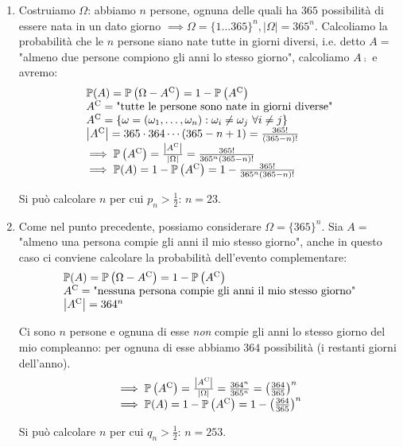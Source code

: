 \begin{enumerate}
\item Costruiamo $\Omega $: abbiamo $n$ persone, ognuna delle quali ha $365$ possibilità di essere nata in un dato giorno $\implies \Omega =\{1\dots 365\}^{n} ,| \Omega | =365^{n}$. Calcoliamo la probabilità che le $n$ persone siano nate tutte in giorni diversi, i.e. detto $A=$ "almeno due persone compiono gli anni lo stesso giorno", calcoliamo $A\comp$ e avremo:\begin{equation*}
\begin{array}{ l }
\mathbb{P}( A) =\mathbb{P}\left( \Omega -A^{\mathrm{C}}\right) =1-\mathbb{P}\left( A^{\mathrm{C}}\right)\\
A^{\mathrm{C}} =\text{"tutte le persone sono nate in giorni diverse"}\\
A^{\mathrm{C}} =\{\omega =( \omega _{1} ,\dots ,\omega _{n}) :\omega _{i} \neq \omega _{j} \ \forall i\neq j\}\\
\left| A^{\mathrm{C}}\right| =365\cdot 364\cdots ( 365-n+1) =\frac{365!}{( 365-n) !}\\
\implies \mathbb{P}\left( A^{\mathrm{C}}\right) =\frac{\left| A^{\mathrm{C}}\right| }{| \Omega | } =\frac{365!}{365^{n}( 365-n) !}\\
\implies \mathbb{P}( A) =1-\mathbb{P}\left( A^{\mathrm{C}}\right) =1-\frac{365!}{365^{n}( 365-n) !}
\end{array}
\end{equation*}

Si può calcolare $n$ per cui $p_{n}  >\frac{1}{2}$: $n=23$.
\item Come nel punto precedente, possiamo considerare $\Omega =\{365\}^{n}$. Sia $A=$ "almeno una persona compie gli anni il mio stesso giorno", anche in questo caso ci conviene calcolare la probabilità dell'evento complementare:\begin{equation*}
\begin{array}{ l }
\mathbb{P}( A) =\mathbb{P}\left( \Omega -A^{\mathrm{C}}\right) =1-\mathbb{P}\left( A^{\mathrm{C}}\right)\\
A^{\mathrm{C}} =\text{"nessuna persona compie gli anni il mio stesso giorno"}\\
\left| A^{\mathrm{C}}\right| =364^{n}
\end{array}
\end{equation*}

Ci sono $n$ persone e ognuna di esse \textit{non} compie gli anni lo stesso giorno del mio compleanno: per ognuna di esse abbiamo $364$ possibilità (i restanti giorni dell'anno).\begin{equation*}
\begin{array}{ l }
\implies \mathbb{P}\left( A^{\mathrm{C}}\right) =\frac{\left| A^{\mathrm{C}}\right| }{| \Omega | } =\frac{364^{n}}{365^{n}} =\left(\frac{364}{365}\right)^{n}\\
\implies \mathbb{P}( A) =1-\mathbb{P}\left( A^{\mathrm{C}}\right) =1-\left(\frac{364}{365}\right)^{n}
\end{array}
\end{equation*}

Si può calcolare $n$ per cui $q_{n}  >\frac{1}{2}$: $n=253$.
\end{enumerate}

